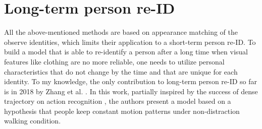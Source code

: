 \section{Long-term person re-ID}
All the above-mentioned methods are based on appearance matching of the observe identities, which limits their application to a short-term person re-ID. To build a model that is able to re-identify a person after a long time when visual features like clothing are no more reliable, one needs to utilize personal characteristics that do not change by the time and that are unique for each identity. To my knowledge, the only contribution to long-term person re-ID so far is in 2018 by Zhang et al. \cite{long-term_re-id_true_motion}. In this work, partially inspired by the success of dense trajectory on action recognition \cite{action_recognition}, the authors present a model based on a hypothesis that people keep constant motion patterns under non-distraction walking condition. 
